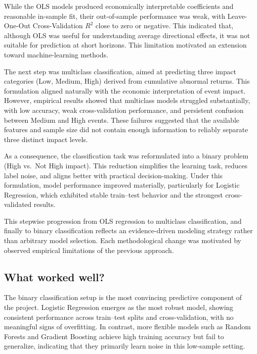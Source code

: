 \documentclass[11pt,a4paper]{article}
\begin{document}
While the OLS models produced economically interpretable coefficients and reasonable in-sample fit, their out-of-sample performance was weak, with Leave-One-Out Cross-Validation $R^2$ close to zero or negative. This indicated that, although OLS was useful for understanding average directional effects, it was not suitable for prediction at short horizons. This limitation motivated an extension toward machine-learning methods.

The next step was multiclass classification, aimed at predicting three impact categories (Low, Medium, High) derived from cumulative abnormal returns. This formulation aligned naturally with the economic interpretation of event impact. However, empirical results showed that multiclass models struggled substantially, with low accuracy, weak cross-validation performance, and persistent confusion between Medium and High events. These failures suggested that the available features and sample size did not contain enough information to reliably separate three distinct impact levels.

As a consequence, the classification task was reformulated into a binary problem (High vs.\ Not High impact). This reduction simplifies the learning task, reduces label noise, and aligns better with practical decision-making. Under this formulation, model performance improved materially, particularly for Logistic Regression, which exhibited stable train--test behavior and the strongest cross-validated results.

This stepwise progression from OLS regression to multiclass classification, and finally to binary classification reflects an evidence-driven modeling strategy rather than arbitrary model selection. Each methodological change was motivated by observed empirical limitations of the previous approach.

\subsection{What worked well?}

The binary classification setup is the most convincing predictive component of the project. Logistic Regression emerges as the most robust model, showing consistent performance across train--test splits and cross-validation, with no meaningful signs of overfitting. In contrast, more flexible models such as Random Forests and Gradient Boosting achieve high training accuracy but fail to generalize, indicating that they primarily learn noise in this low-sample setting.
\end{document}
